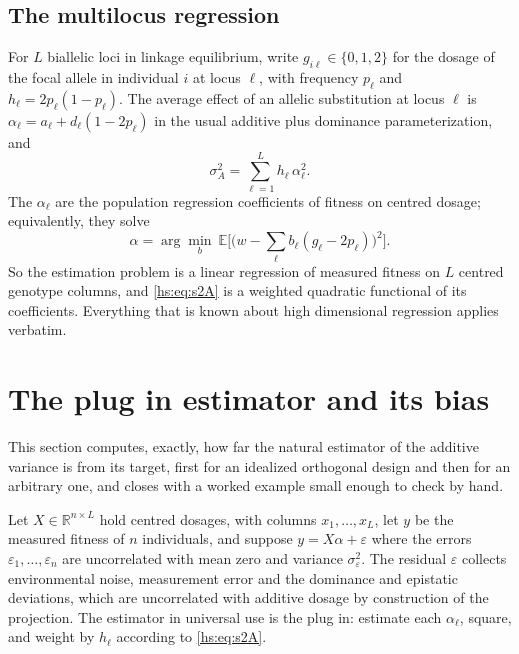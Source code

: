 \subsection{The multilocus regression}

For $L$ biallelic loci in linkage equilibrium, write $g_{i\ell} \in \{0,1,2\}$ for the dosage of the focal allele in individual $i$ at locus $\ell$, with frequency $p_\ell$ and $h_\ell = 2p_\ell(1-p_\ell)$. The average effect of an allelic substitution at locus $\ell$ is $\alpha_\ell = a_\ell + d_\ell(1-2p_\ell)$ in the usual additive plus dominance parameterization, and
\begin{equation}
\sigma^2_A = \sum_{\ell=1}^{L} h_\ell\,\alpha_\ell^2 .
\label{hs:eq:s2A}
\end{equation}
The $\alpha_\ell$ are the population regression coefficients of fitness on centred dosage; equivalently, they solve
\[
\alpha = \arg\min_{b}\ \mathbb{E}\Big[\big(w - \textstyle\sum_\ell b_\ell(g_\ell - 2p_\ell)\big)^2\Big].
\]
So the estimation problem is a linear regression of measured fitness on $L$ centred genotype columns, and \eqref{hs:eq:s2A} is a weighted quadratic functional of its coefficients. Everything that is known about high dimensional regression applies verbatim.

\section{The plug in estimator and its bias}
\label{hs:sec:bias}

This section computes, exactly, how far the natural estimator of the additive variance is from its target, first for an idealized orthogonal design and then for an arbitrary one, and closes with a worked example small enough to check by hand.

Let $X \in \mathbb{R}^{n\times L}$ hold centred dosages, with columns $x_1,\ldots,x_L$, let $y$ be the measured fitness of $n$ individuals, and suppose $y = X\alpha + \varepsilon$ where the errors $\varepsilon_1,\ldots,\varepsilon_n$ are uncorrelated with mean zero and variance $\sigma^2_\varepsilon$. The residual $\varepsilon$ collects environmental noise, measurement error and the dominance and epistatic deviations, which are uncorrelated with additive dosage by construction of the projection. The estimator in universal use is the plug in: estimate each $\alpha_\ell$, square, and weight by $h_\ell$ according to \eqref{hs:eq:s2A}.

